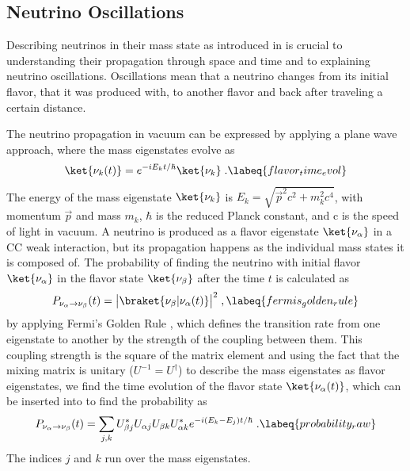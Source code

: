 \subsection{Neutrino Oscillations} 

Describing neutrinos in their mass state as introduced in  is crucial to understanding their propagation through space and time and to explaining neutrino oscillations. Oscillations mean that a neutrino changes from its initial flavor, that it was produced with, to another flavor and back after traveling a certain distance.

The neutrino propagation in vacuum can be expressed by applying a plane wave approach, where the mass eigenstates evolve as
\begin{equation}
    \ket{\nu_k(t)} = e^{-iE_kt/\hbar}\ket{\nu_k}
    \;.
    \labeq{flavor_time_evol}
\end{equation}
The energy of the mass eigenstate $\ket{\nu_k}$ is $E_k=\sqrt{\vec{p}^2c^2+m_k^2c^4}$, with momentum $\vec{p}$ and mass $m_k$, $\hbar$ is the reduced Planck constant, and c is the speed of light in vacuum. A neutrino is produced as a flavor eigenstate $\ket{\nu_\alpha}$ in a CC weak interaction, but its propagation happens as the individual mass states it is composed of. The probability of finding the neutrino with initial flavor $\ket{\nu_\alpha}$ in the flavor state $\ket{\nu_\beta}$ after the time $t$ is calculated as
\begin{equation}
    P_{\nu_\alpha \rightarrow \nu_\beta}(t)
    =
    \big|\braket{\nu_\beta|\nu_\alpha(t)}\big|^2
    \;,
    \labeq{fermis_golden_rule}
\end{equation}
by applying Fermi's Golden Rule , which defines the transition rate from one eigenstate to another by the strength of the coupling between them. This coupling strength is the square of the matrix element and using the fact that the mixing matrix is unitary ($U^{-1}=U^\dagger$) to describe the mass eigenstates as flavor eigenstates, we find the time evolution of the flavor state $\ket{\nu_\alpha(t)}$, which can be inserted into  to find the probability as
\begin{equation}
    P_{\nu_\alpha \rightarrow \nu_\beta}(t)
    =
    \sum_{j,k}U^*_{\beta j}U_{\alpha j}U_{\beta k}U^*_{\alpha k}e^{-i(E_k-E_j)t/\hbar}
    \;.
    \labeq{probability_raw}
\end{equation}
The indices $j$ and $k$ run over the mass eigenstates.

